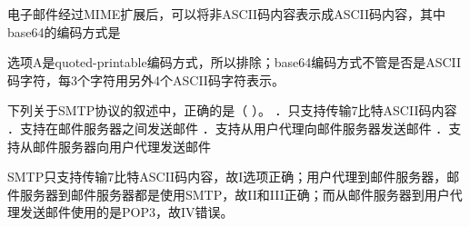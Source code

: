 \question 电子邮件经过MIME扩展后，可以将非ASCII码内容表示成ASCII码内容，其中base64的编码方式是
\par{}
\begin{solution}选项A是quoted-printable编码方式，所以排除；base64编码方式不管是否是ASCII码字符，每3个字符用另外4个ASCII码字符表示。
\end{solution}
\question 下列关于SMTP协议的叙述中，正确的是（ ）。 ．只支持传输7比特ASCII码内容
．支持在邮件服务器之间发送邮件 ．支持从用户代理向邮件服务器发送邮件
．支持从邮件服务器向用户代理发送邮件
\par{}
\begin{solution}SMTP只支持传输7比特ASCII码内容，故I选项正确；用户代理到邮件服务器，邮件服务器到邮件服务器都是使用SMTP，故II和III正确；而从邮件服务器到用户代理发送邮件使用的是POP3，故IV错误。
\end{solution}

